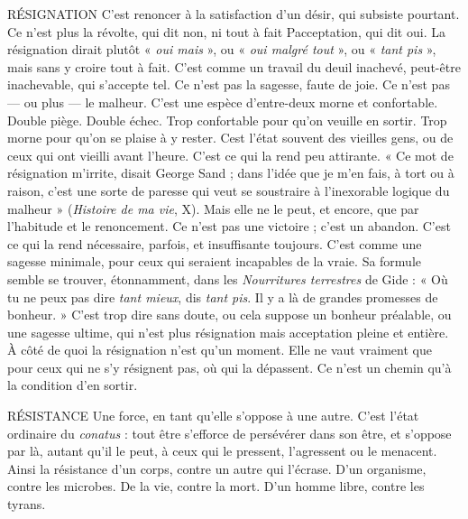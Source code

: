 RÉSIGNATION C’est renoncer à la satisfaction d’un désir, qui subsiste
pourtant. Ce n’est plus la révolte, qui dit non, ni tout à fait
Pacceptation, qui dit oui. La résignation dirait plutôt « {\it oui mais} », ou « {\it oui
malgré tout} », ou « {\it tant pis} », mais sans y croire tout à fait. C’est comme un travail
du deuil inachevé, peut-être inachevable, qui s’accepte tel. Ce n’est pas la
sagesse, faute de joie. Ce n’est pas — ou plus — le malheur. C’est une espèce
d’entre-deux morne et confortable. Double piège. Double échec. Trop confortable
pour qu’on veuille en sortir. Trop morne pour qu’on se plaise à y rester.
Cest l’état souvent des vieilles gens, ou de ceux qui ont vieilli avant l'heure.
C’est ce qui la rend peu attirante. « Ce mot de résignation m'irrite, disait
George Sand ; dans l’idée que je m’en fais, à tort ou à raison, c’est une sorte de
paresse qui veut se soustraire à l’inexorable logique du malheur » ({\it Histoire de
ma vie}, X). Mais elle ne le peut, et encore, que par l'habitude et le renoncement.
Ce n’est pas une victoire ; c’est un abandon. C’est ce qui la rend nécessaire,
parfois, et insuffisante toujours. C’est comme une sagesse minimale, pour
ceux qui seraient incapables de la vraie. Sa formule semble se trouver, étonnamment,
dans les {\it Nourritures terrestres} de Gide : « Où tu ne peux pas dire {\it tant
mieux}, dis {\it tant pis}. Il y a là de grandes promesses de bonheur. » C’est trop dire
sans doute, ou cela suppose un bonheur préalable, ou une sagesse ultime, qui
n’est plus résignation mais acceptation pleine et entière. À côté de quoi la résignation
n’est qu’un moment. Elle ne vaut vraiment que pour ceux qui ne s’y
résignent pas, où qui la dépassent. Ce n’est un chemin qu’à la condition d’en
sortir.

RÉSISTANCE Une force, en tant qu’elle s'oppose à une autre. C’est l’état
ordinaire du {\it conatus} : tout être s'efforce de persévérer dans
son être, et s’oppose par là, autant qu’il le peut, à ceux qui le pressent, l’agressent
ou le menacent. Ainsi la résistance d’un corps, contre un autre qui l’écrase.
D'un organisme, contre les microbes. De la vie, contre la mort. D’un homme
libre, contre les tyrans.

